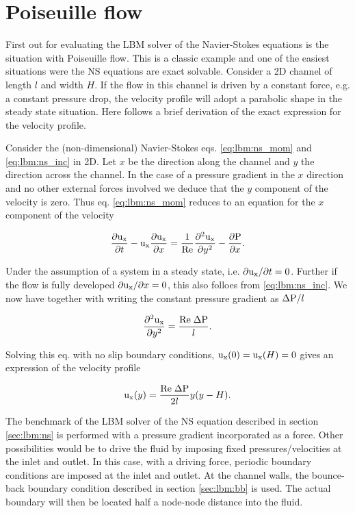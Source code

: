 \section{Poiseuille flow}
First out for evaluating the LBM solver of the Navier-Stokes equations
is the situation with Poiseuille flow. This is a classic example and
one of the easiest situations were the NS equations are exact
solvable. Consider a 2D channel of length $l$ and width $H$. If the
flow in this channel is driven by a constant force, e.g. a constant
pressure drop, the velocity profile will adopt a parabolic shape in
the steady state situation. Here follows a brief derivation of the
exact expression for the velocity profile.

Consider the (non-dimensional) Navier-Stokes
eqs. \eqref{eq:lbm:ns_mom} and \eqref{eq:lbm:ns_inc} in
2D. Let $x$ be the direction along the channel and $y$ the direction
across the channel. In the case of a pressure gradient in the $x$
direction and no other external forces involved we deduce that the $y$
component of the velocity is zero. Thus eq. \eqref{eq:lbm:ns_mom}
reduces to an equation for the $x$ component of the velocity

\begin{equation}
\dfrac{\partial \mathrm{u_x}}{\partial t} - \mathrm{u_x} \dfrac{\partial \mathrm{u_x}}{\partial
  x} = \frac{1}{\mathrm{Re}} \dfrac{\partial^2 \mathrm{u_x}}{\partial y^2} -
\dfrac{\partial \mathrm{P}}{\partial x}.
\end{equation}
 
Under the assumption of a system in a steady state, i.e. ${\partial
  \mathrm{u_x}}/{\partial t} = 0$. Further if the flow is fully developed
${\partial \mathrm{u_x}}/{\partial x} = 0$, this also folloes from
\eqref{eq:lbm:ns_inc}. We now have together
with writing the constant pressure gradient as $\Delta \mathrm{P}/l$

\begin{equation}
\dfrac{\partial^2 \mathrm{u_x}}{\partial y^2} =
\dfrac{\mathrm{Re}\; \Delta\mathrm{P}}{l}.
\end{equation}

Solving this eq. with no slip boundary conditions, $\mathrm{u_x}(0) = \mathrm{u_x}(H) =
0$ gives an expression of the velocity profile

\begin{equation}\label{eq:mb:ana_poi}
\mathrm{u_x}(y) = \dfrac{\mathrm{Re}\; \Delta\mathrm{P}}{2l}y(y - H).
\end{equation}

The benchmark of the LBM solver of the NS equation described in
section \ref{sec:lbm:ns} is performed with a pressure gradient
incorporated as a force. Other possibilities would be to drive the
fluid by imposing fixed pressures/velocities at the inlet and outlet.
In this case, with a driving force, periodic boundary conditions are
imposed at the inlet and outlet. At the channel walls, the bounce-back
boundary condition described in section \ref{sec:lbm:bb} is used. The
actual boundary will then be located half a node-node distance into
the fluid.

